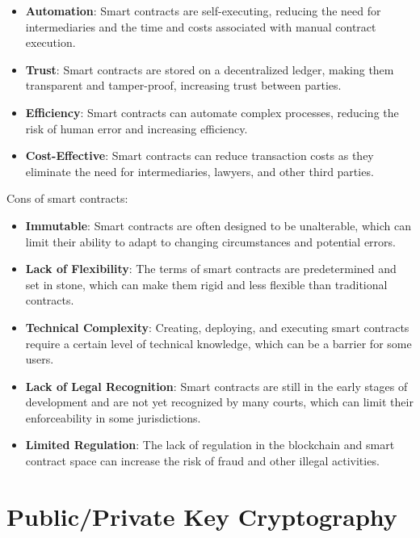 \documentclass[target=mst,aauheader=]{thud}
\begin{document}
    \begin{itemize}    

        \item \textbf{Automation}: Smart contracts are self-executing, reducing the need for intermediaries and the time and costs associated with manual contract execution.
        \item \textbf{Trust}: Smart contracts are stored on a decentralized ledger, making them transparent and tamper-proof, increasing trust between parties.
        \item \textbf{Efficiency}: Smart contracts can automate complex processes, reducing the risk of human error and increasing efficiency.
        \item \textbf{Cost-Effective}: Smart contracts can reduce transaction costs as they eliminate the need for intermediaries, lawyers, and other third parties.

    \end{itemize}

    Cons of smart contracts:

    \begin{itemize}

        \item \textbf{Immutable}: Smart contracts are often designed to be unalterable, which can limit their ability to adapt to changing circumstances and potential errors.
        \item \textbf{Lack of Flexibility}: The terms of smart contracts are predetermined and set in stone, which can make them rigid and less flexible than traditional contracts.
        \item \textbf{Technical Complexity}: Creating, deploying, and executing smart contracts require a certain level of technical knowledge, which can be a barrier for some users.
        \item \textbf{Lack of Legal Recognition}: Smart contracts are still in the early stages of development and are not yet recognized by many courts, which can limit their enforceability in some jurisdictions.
        \item \textbf{Limited Regulation}: The lack of regulation in the blockchain and smart contract space can increase the risk of fraud and other illegal activities.

    \end{itemize}


    \section{Public/Private Key Cryptography}
    
\end{document}
